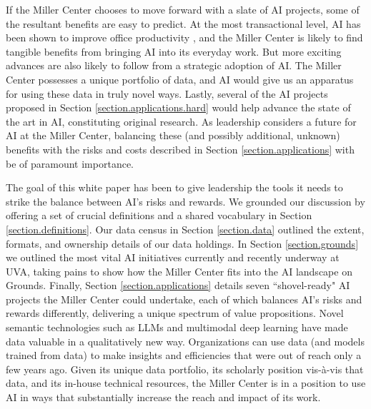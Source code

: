 \documentclass[12pt, oneside]{article}   	%
\begin{document}
If the Miller Center chooses to move forward with a slate of AI projects, some of the resultant benefits are easy to predict.  At the most transactional level, AI has been shown to improve office productivity \cite{candelon:2023}, and the Miller Center is likely to find tangible benefits from bringing AI into its everyday work.  But more exciting advances are also likely to follow from a strategic adoption of AI.  The Miller Center possesses a unique portfolio of data, and AI would give us an apparatus for using these data in truly novel ways.  Lastly, several of the AI projects  proposed in Section \ref{section.applications.hard} would help advance the state of the art in AI, constituting original research.  As leadership considers a future for AI at the Miller Center, balancing these (and possibly additional, unknown) benefits with the risks and costs described in Section \ref{section.applications} with be of paramount importance.


The goal of this white paper has been to give leadership the tools it needs to strike the balance between AI's risks and rewards.  We grounded our discussion by offering a set of crucial definitions and a shared vocabulary in Section \ref{section.definitions}.  Our data census in Section \ref{section.data} outlined the extent, formats, and ownership details of our data holdings.  In Section \ref{section.grounds} we outlined the most vital AI initiatives currently and recently underway at UVA, taking pains to show how the Miller Center fits into the AI landscape on Grounds.  Finally, Section \ref{section.applications} details seven ``shovel-ready" AI projects the Miller Center could undertake, each of which balances AI's risks and rewards differently, delivering a unique spectrum of value propositions.  Novel semantic  technologies such as LLMs and multimodal deep learning have made data valuable in a qualitatively new way.  Organizations can use data (and models trained from data) to make insights and efficiencies that  were out of reach only a few years ago.  Given its unique data portfolio, its scholarly position vis-\`{a}-vis that data, and its in-house technical resources, the Miller Center is in a position to use AI in ways that substantially increase the reach and impact of its work. 










\pagebreak


\end{document}
